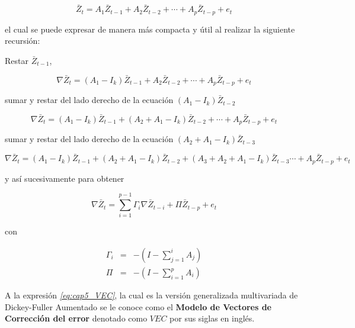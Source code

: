  \begin{equation}
 \bar{Z}_t= A_1\bar{Z}_{t-1} + A_2\bar{Z}_{t-2}+ \cdots + A_p\bar{Z}_{t-p} +e_t
 \end{equation} 
 
 el cual se puede expresar de manera más compacta y útil al realizar la siguiente recursión:\bigskip 
 
 Restar $\bar{Z}_{t-1}$,

 \begin{equation}
 \nabla \bar{Z}_t= (A_1- I_k)\bar{Z}_{t-1} + A_2\bar{Z}_{t-2}+ \cdots + A_p\bar{Z}_{t-p} +e_t \nonumber
 \end{equation}

sumar y restar del lado derecho de la ecuación $(A_1-I_k)\bar{Z}_{t-2}$

 \begin{equation}
\nabla \bar{Z}_t= (A_1- I_k)\bar{Z}_{t-1} + (A_2+ A_1-I_k)\bar{Z}_{t-2}+ \cdots + A_p\bar{Z}_{t-p}+e_t \nonumber
 \end{equation}
 
 sumar y restar del lado derecho de la ecuación $(A_2+A_1-I_k)\bar{Z}_{t-3}$
 
  \begin{equation}
\nabla \bar{Z}_t= (A_1- I_k)\bar{Z}_{t-1} + (A_2+ A_1-I_k)\bar{Z}_{t-2}+  (A_3+A_2+ A_1-I_k)\bar{Z}_{t-3}\cdots + A_p\bar{Z}_{t-p}+e_t \nonumber
 \end{equation}
 
 y así sucesivamente para obtener 
 
   \begin{equation}  \label{eq:cap5_VEC} %
\nabla \bar{Z}_t=\sum_{i=1}^{p-1}\Gamma_i\nabla\bar{Z}_{t-i} + \Pi\bar{Z}_{t-p}+  e_t
 \end{equation}
 
con 

\begin{eqnarray}
\Gamma_i&=&-\left (I-\sum_{j=1}^{i} A_j  \right )\\
\Pi&=&-\left (I-\sum_{i=1}^{p} A_i  \right )
\end{eqnarray}

A la expresión \textit{\ref{eq:cap5_VEC}}, la cual es la versión generalizada multivariada de Dickey-Fuller Aumentado se le conoce como el \textbf{Modelo de Vectores de Corrección del error} denotado como $VEC$ por sus siglas en inglés. \bigskip 

